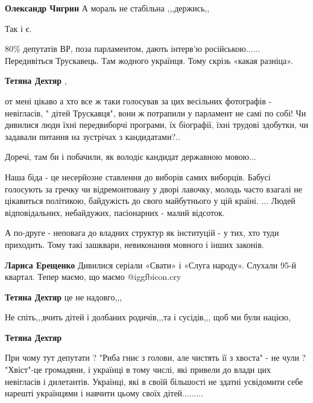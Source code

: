 \begin{itemize}
\begin{itemize} %
\textbf{Олександр Чигрин} А мораль не стабільна ,,,держись,,
\end{itemize} %

Так і є.


80\% депутатів ВР, поза парламентом, дають інтерв'ю російською......
Передивіться Трускавець. Там жодного українця. Тому скрізь «какая разніца».

\begin{itemize} %
\textbf{Тетяна Дехтяр} , 

от мені цікаво а хто все ж таки голосував за цих весільних фотографів -
невігласів, " дітей Трускавця", вони ж потрапили у парламент не самі по собі!
Чи дивилися люди їхні передвиборчі програми, їх біографії, їхні трудові
здобутки, чи задавали питання на зустрічах з кандидатами?..

Доречі, там би і побачили, як володіє кандидат державною мовою...

Наша біда - це несерйозне ставлення до виборів самих виборців. Бабусі голосують
за гречку чи відремонтовану у дворі лавочку, молодь часто взагалі не цікавиться
політикою, байдужість до свого майбутнього у цій країні. ... Людей
відповідальних, небайдужих, пасіонарних - малий відсоток.

А по-друге - неповага до владних структур як інституцій - у тих, хто туди
приходить. Тому такі зашквари, невиконання мовного і інших законів.

\begin{itemize} %
\textbf{Лариса Ерещенко} Дивилися серіали «Свати» і «Слуга народу». Слухали 95-й квартал. Тепер маємо, що маємо  @igg{fbicon.cry} 
\end{itemize} %

\textbf{Тетяна Дехтяр} це не надовго,,,

\begin{itemize} %
Не спіть,,,вчить дітей і долбаних родичів,,,та і сусідів,,, щоб ми були нацією,
\end{itemize} %

\textbf{Тетяна Дехтяр} 

При чому тут депутати ? "Риба гниє з голови, але чистять її з хвоста" - не чули
? "Хвіст"-це громадяни, і українці в тому числі, які привели до влади цих
невігласів і дилетантів. Українці, які в своїй більшості не здатні усвідомити
себе нарешті українцями і навчити цьому своїх дітей.........


\end{itemize}
\end{itemize}
